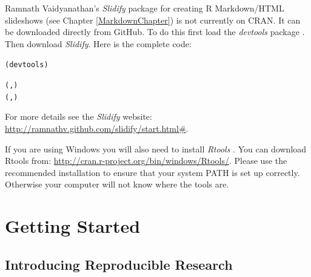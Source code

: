 \documentclass[krantz1]{krantz}
\begin{document}
 Ramnath Vaidyanathan's \emph{Slidify} package \citeyearpar{R-slidify} for creating R Markdown/HTML slideshows (see Chapter \ref{MarkdownChapter}) is not currently on CRAN. It can be downloaded directly from GitHub. To do this first load the \emph{devtools} package \cite[]{R-devtools}. Then download \emph{Slidify}. Here is the complete code:

\begin{knitrout}
\color{fgcolor}\begin{kframe}
\begin{alltt}
(devtools)

(, )
(, )
\end{alltt}
\end{kframe}
\end{knitrout}


\noindent For more details see the \emph{Slidify} website: \url{http://ramnathv.github.com/slidify/start.html#}.

If you are using Windows you will also need to install \emph{Rtools} \cite[]{Rtools}. You can download Rtools from: \url{http://cran.r-project.org/bin/windows/Rtools/}.\label{RtoolsDownload} Please use the recommended installation to ensure that your system PATH is set up correctly. Otherwise your computer will not know where the tools are.





\listoffigures
\listoftables


\mainmatter

\setcounter{page}{1}

\part{Getting Started}





\chapter{Introducing Reproducible Research}\label{Intro}
\end{document}
